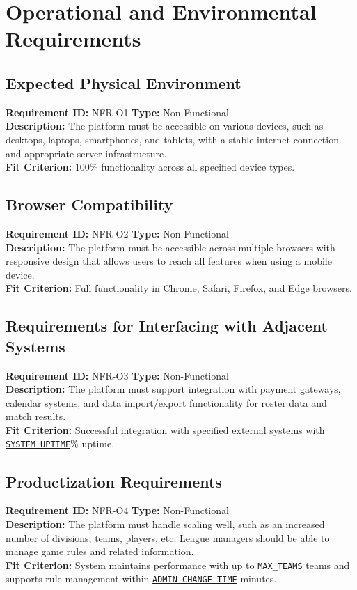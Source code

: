 \documentclass[12pt, titlepage]{article}
\begin{document}
\section{Operational and Environmental Requirements}
\subsection{Expected Physical Environment}
\textbf{Requirement ID:} NFR-O1 \quad \textbf{Type:} Non-Functional \\
\textbf{Description:} The platform must be accessible on various devices, such as desktops, laptops, smartphones, and tablets, with a stable internet connection and appropriate server infrastructure.\\
\textbf{Fit Criterion:} 100\% functionality across all specified device types.

\subsection{Browser Compatibility}
\textbf{Requirement ID:} NFR-O2 \quad \textbf{Type:} Non-Functional \\
\textbf{Description:} The platform must be accessible across multiple browsers with responsive design that allows users to reach all features when using a mobile device.\\
\textbf{Fit Criterion:} Full functionality in Chrome, Safari, Firefox, and Edge browsers.

\subsection{Requirements for Interfacing with Adjacent Systems}
\textbf{Requirement ID:} NFR-O3 \quad \textbf{Type:} Non-Functional \\
\textbf{Description:} The platform must support integration with payment gateways, calendar systems, and data import/export functionality for roster data and match results.\\
\textbf{Fit Criterion:} Successful integration with specified external systems with \hyperref[SYSTEM_UPTIME]{\texttt{SYSTEM\_UPTIME}}\% uptime.

\subsection{Productization Requirements}
\textbf{Requirement ID:} NFR-O4 \quad \textbf{Type:} Non-Functional \\
\textbf{Description:} The platform must handle scaling well, such as an increased number of divisions, teams, players, etc. League managers should be able to manage game rules and related information.\\
\textbf{Fit Criterion:} System maintains performance with up to \hyperref[MAX_TEAMS]{\texttt{MAX\_TEAMS}} teams and supports rule management within \hyperref[ADMIN_CHANGE_TIME]{\texttt{ADMIN\_CHANGE\_TIME}} minutes.
\end{document}
